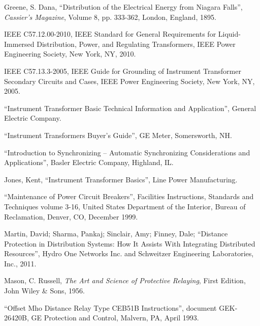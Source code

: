 \vskip 10pt

\noindent
Greene, S. Dana, ``Distribution of the Electrical Energy from Niagara Falls'', \textit{Cassier's Magazine}, Volume 8, pp. 333-362, London, England, 1895.

\vskip 10pt

\noindent
IEEE C57.12.00-2010, IEEE Standard for General Requirements for Liquid-Immersed Distribution, Power, and Regulating Transformers, IEEE Power Engineering Society, New York, NY, 2010.

\vskip 10pt

\noindent
IEEE C57.13.3-2005, IEEE Guide for Grounding of Instrument Transformer Secondary Circuits and Cases, IEEE Power Engineering Society, New York, NY, 2005.

\vskip 10pt

\noindent
``Instrument Transformer Basic Technical Information and Application'', General Electric Company.

\vskip 10pt

\noindent
``Instrument Transformers Buyer's Guide'', GE Meter, Somersworth, NH.

\vskip 10pt

\noindent
``Introduction to Synchronizing -- Automatic Synchronizing Considerations and Applications'', Basler Electric Company, Highland, IL.

\vskip 10pt

\noindent
Jones, Kent, ``Instrument Transformer Basics'', Line Power Manufacturing.

\vskip 10pt

\noindent
``Maintenance of Power Circuit Breakers'', Facilities Instructions, Standards and Techniques volume 3-16, United States Department of the Interior, Bureau of Reclamation, Denver, CO, December 1999.

\vskip 10pt

\noindent
Martin, David; Sharma, Pankaj; Sinclair, Amy; Finney, Dale; ``Distance Protection in Distribution Systems: How It Assists With Integrating Distributed Resources'', Hydro One Networks Inc. and Schweitzer Engineering Laboratories, Inc., 2011.

\vskip 10pt

\noindent
Mason, C. Russell, \textit{The Art and Science of Protective Relaying}, First Edition, John Wiley \& Sons, 1956.

\vskip 10pt

\noindent
``Offset Mho Distance Relay Type CEB51B Instructions'', document GEK-26420B, GE Protection and Control, Malvern, PA, April 1993.

